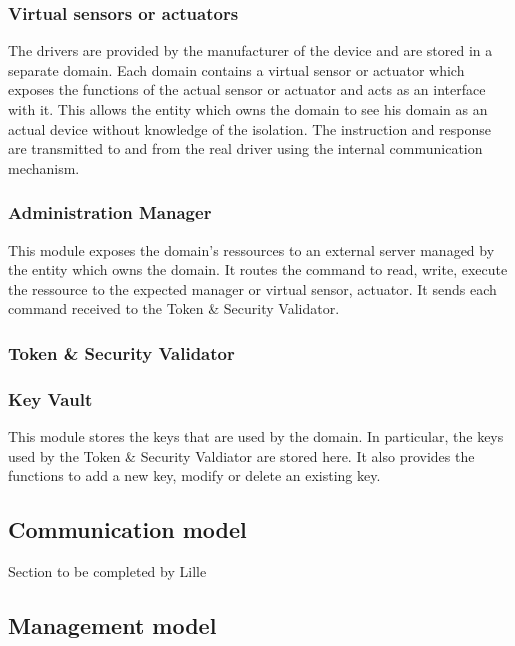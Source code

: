 \documentclass[conference]{IEEEtran}
\begin{document}
\subsubsection{Virtual sensors or actuators}
\label{sec:virtual_sensor}
The drivers are provided by the manufacturer of the device and are stored in a separate domain. Each domain contains a virtual sensor or actuator which exposes the functions of the actual sensor or actuator and acts as an interface with it. This allows the entity which owns the domain to see his domain as an actual device without knowledge of the isolation. The instruction and response are transmitted to and from the real driver using the internal communication mechanism.  

\subsubsection{Administration Manager}
\label{sec:Admin_Mgr}
This module exposes the domain's ressources to an external server managed by the entity which owns the domain. It routes the command to read, write, execute the ressource to the expected manager or virtual sensor, actuator. It sends each command received to the Token \& Security Validator. 

\subsubsection{Token \& Security Validator}
\label{sec:Token_Validator}

\subsubsection{Key Vault}
\label{sec:Key_Vault}
This module stores the keys that are used by the domain. In particular, the keys used by the Token \& Security Valdiator are stored here. It also provides the functions to add a new key, modify or delete an existing key. 


\subsection{Communication model}
\label{sec:Communication_model}
Section to be completed by Lille


\subsection{Management model}
\label{sec:Management_model}
\end{document}
